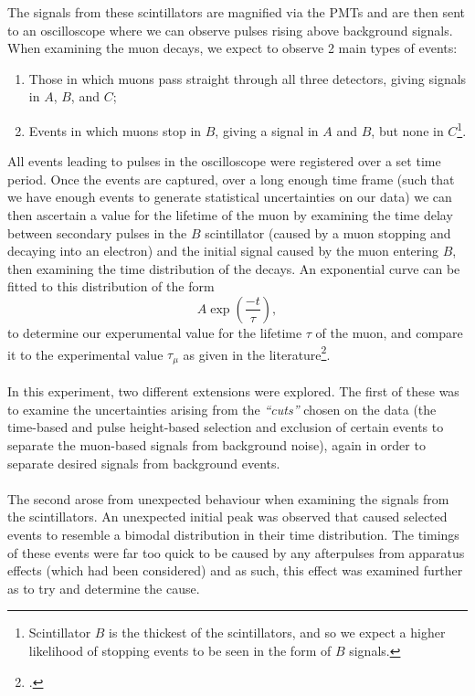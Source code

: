 \documentclass[a4paper]{article}
\begin{document}
\newpage \noindent
The signals from these scintillators are magnified via the PMTs and are then sent to an oscilloscope where we can observe pulses rising above background signals. When examining the muon decays, we expect to observe 2 main types of events: 
\begin{enumerate}
	\item Those in which muons pass straight through all three detectors, giving signals in $A$, $B$, and $C$;
	\item Events in which muons stop in $B$, giving a signal in $A$ and $B$, but none in $C$\footnote{Scintillator $B$ is the thickest of the scintillators, and so we expect a higher likelihood of stopping events to be seen in the form of $B$ signals.}.
\end{enumerate}
\noindent All events leading to pulses in the oscilloscope were registered over a set time period.
Once the events are captured, over a long enough time frame (such that we have enough events to generate statistical uncertainties on our data) we can then ascertain a value for the lifetime of the muon by examining the time delay between secondary pulses in the $B$ scintillator (caused by a muon stopping and decaying into an electron) and the initial signal caused by the muon entering $B$, then examining the time distribution of the decays. 
An exponential curve can be fitted to this distribution of the form 
\begin{equation}
	A\exp \left( \frac{-t}{\tau}  \right),
\end{equation}
to determine our experumental value for the lifetime $\tau$ of the muon, and compare it to the experimental value $\tau_\mu$ as given in the literature\footcite{muonlifetime}.
\\\\
In this experiment, two different extensions were explored. The first of these was to examine the uncertainties arising from the \textit{``cuts''} chosen on the data (the time-based and pulse height-based selection and exclusion of certain events to separate the muon-based signals from background noise), again in order to separate desired signals from background events.
\\\\
The second arose from unexpected behaviour when examining the signals from the scintillators. An unexpected initial peak was observed that caused selected events to resemble a bimodal distribution in their time distribution. The timings of these events were far too quick to be caused by any afterpulses from apparatus effects (which had been considered) and as such, this effect was examined further as to try and determine the cause.
\end{document}
